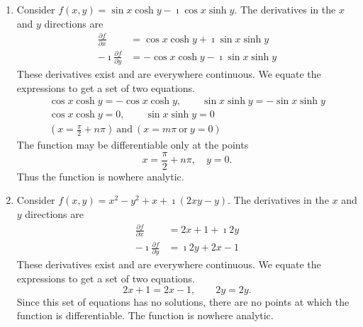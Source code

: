 {%
\begin{Solution}
  \label{solution x2y2x}
  \begin{enumerate}
  \item
    Consider $f(x,y) = \sin x \cosh y - \imath \cos x \sinh y$.
    The derivatives in the $x$ and $y$ directions are
    \begin{align*}
      \frac{\partial f}{\partial x} &= \cos x \cosh y + \imath \sin x \sinh y 
      \\
      -\imath  \frac{\partial f}{\partial y} &= - \cos x \cosh y - \imath \sin x \sinh y
    \end{align*}
    These derivatives exist and are everywhere continuous.  We equate the
    expressions to get a set of two equations.
    \begin{gather*}
      \cos x \cosh y = - \cos x \cosh y, \qquad
      \sin x \sinh y = - \sin x \sinh y 
      \\
      \cos x \cosh y = 0, \qquad
      \sin x \sinh y = 0 
      \\
      \left( x = \frac{\pi}{2} + n \pi \right)\ \mathrm{and}\ 
      \left( x = m \pi\ \mathrm{or}\ y = 0 \right) 
    \end{gather*}
    The function may be differentiable only at the points
    \[
    \boxed{
      x = \frac{\pi}{2} + n \pi, \quad y = 0.
      }
    \]
    Thus the function is nowhere analytic.
  \item 
    Consider $f(x,y) = x^2 - y^2 + x + \imath (2 x y - y)$.
    The derivatives in the $x$ and $y$ directions are
    \begin{align*}
      \frac{\partial f}{\partial x} &= 2 x + 1 + \imath 2 y 
      \\
      -\imath  \frac{\partial f}{\partial y} &= \imath 2 y + 2 x - 1
    \end{align*}
    These derivatives exist and are everywhere continuous.  We equate the
    expressions to get a set of two equations.
    \[
    2 x + 1 = 2 x - 1, \qquad 2 y = 2 y.
    \]
    Since this set of equations has no solutions, there are no points at which
    the function is differentiable.  The function is nowhere analytic.
  \end{enumerate}
\end{Solution}







}
